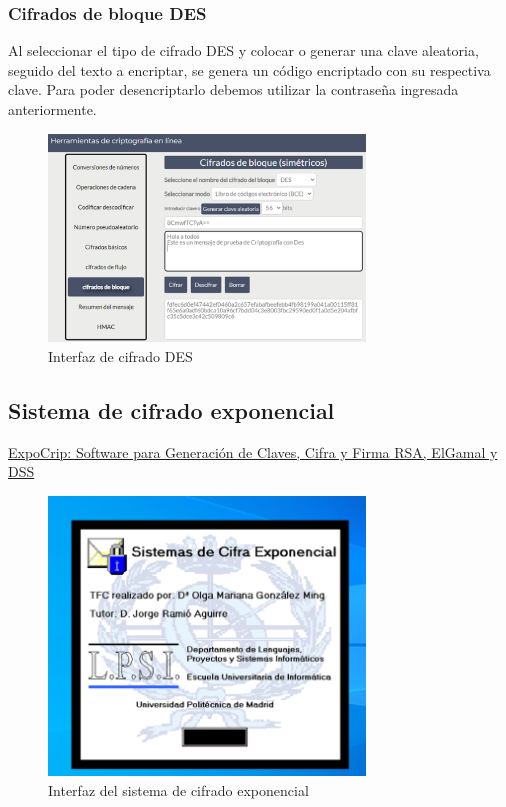\subsubsection{Cifrados de bloque DES}

Al seleccionar el tipo de cifrado DES y colocar o generar una clave aleatoria, seguido del texto a encriptar, se genera un código encriptado con su respectiva clave. Para poder desencriptarlo debemos utilizar la contraseña ingresada anteriormente.
	
\begin{figure}[H]
	\centering
	\includegraphics[width=0.75\textwidth]{./assets/img5.png}
	\caption{Interfaz de cifrado DES}
	\label{fig:des-encryption}
\end{figure}

\FloatBarrier

\subsection{Sistema de cifrado exponencial}

\href{https://www.criptored.es/software/sw_m001l.htm}{ExpoCrip: Software para Generación de Claves, Cifra y Firma RSA, ElGamal y DSS}

\begin{figure}[H]
	\centering
	\includegraphics[width=0.75\textwidth]{./assets/img6.png}
	\caption{Interfaz del sistema de cifrado exponencial}
	\label{fig:expocrip-interface}
\end{figure}

